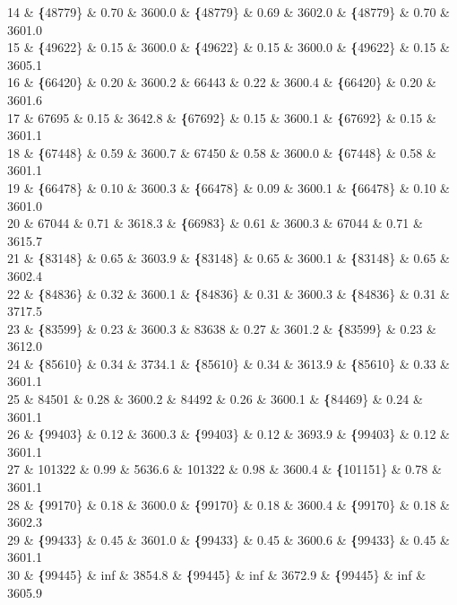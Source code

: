14 \& \textbf\{48779\} \& 0.70 \& 3600.0 \& \textbf\{48779\} \& 0.69 \& 3602.0 \& \textbf\{48779\} \& 0.70 \& 3601.0 \\
15 \& \textbf\{49622\} \& 0.15 \& 3600.0 \& \textbf\{49622\} \& 0.15 \& 3600.0 \& \textbf\{49622\} \& 0.15 \& 3605.1 \\
16 \& \textbf\{66420\} \& 0.20 \& 3600.2 \& 66443 \& 0.22 \& 3600.4 \& \textbf\{66420\} \& 0.20 \& 3601.6 \\
17 \& 67695 \& 0.15 \& 3642.8 \& \textbf\{67692\} \& 0.15 \& 3600.1 \& \textbf\{67692\} \& 0.15 \& 3601.1 \\
18 \& \textbf\{67448\} \& 0.59 \& 3600.7 \& 67450 \& 0.58 \& 3600.0 \& \textbf\{67448\} \& 0.58 \& 3601.1 \\
19 \& \textbf\{66478\} \& 0.10 \& 3600.3 \& \textbf\{66478\} \& 0.09 \& 3600.1 \& \textbf\{66478\} \& 0.10 \& 3601.0 \\
20 \& 67044 \& 0.71 \& 3618.3 \& \textbf\{66983\} \& 0.61 \& 3600.3 \& 67044 \& 0.71 \& 3615.7 \\
21 \& \textbf\{83148\} \& 0.65 \& 3603.9 \& \textbf\{83148\} \& 0.65 \& 3600.1 \& \textbf\{83148\} \& 0.65 \& 3602.4 \\
22 \& \textbf\{84836\} \& 0.32 \& 3600.1 \& \textbf\{84836\} \& 0.31 \& 3600.3 \& \textbf\{84836\} \& 0.31 \& 3717.5 \\
23 \& \textbf\{83599\} \& 0.23 \& 3600.3 \& 83638 \& 0.27 \& 3601.2 \& \textbf\{83599\} \& 0.23 \& 3612.0 \\
24 \& \textbf\{85610\} \& 0.34 \& 3734.1 \& \textbf\{85610\} \& 0.34 \& 3613.9 \& \textbf\{85610\} \& 0.33 \& 3601.1 \\
25 \& 84501 \& 0.28 \& 3600.2 \& 84492 \& 0.26 \& 3600.1 \& \textbf\{84469\} \& 0.24 \& 3601.1 \\
26 \& \textbf\{99403\} \& 0.12 \& 3600.3 \& \textbf\{99403\} \& 0.12 \& 3693.9 \& \textbf\{99403\} \& 0.12 \& 3601.1 \\
27 \& 101322 \& 0.99 \& 5636.6 \& 101322 \& 0.98 \& 3600.4 \& \textbf\{101151\} \& 0.78 \& 3601.1 \\
28 \& \textbf\{99170\} \& 0.18 \& 3600.0 \& \textbf\{99170\} \& 0.18 \& 3600.4 \& \textbf\{99170\} \& 0.18 \& 3602.3 \\
29 \& \textbf\{99433\} \& 0.45 \& 3601.0 \& \textbf\{99433\} \& 0.45 \& 3600.6 \& \textbf\{99433\} \& 0.45 \& 3601.1 \\
30 \& \textbf\{99445\} \& inf \& 3854.8 \& \textbf\{99445\} \& inf \& 3672.9 \& \textbf\{99445\} \& inf \& 3605.9 \\
